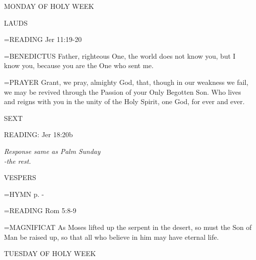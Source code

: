 \begin{center}
\normalsize \begin{center}\normalsize MONDAY OF HOLY WEEK\\
\end{center}
\end{center}

\begin{flushleft}\normalsize LAUDS\\\end{flushleft}

\hangindent=\parindent \small{READING}    Jer 11:19-20 \textbf{   \\}

\hangindent=\parindent \small{BENEDICTUS 	Father, righteous One, the world does not know you, but I know you, because you are the One who sent me.\\}

\hangindent=\parindent \small{PRAYER 	Grant, we pray, almighty God, that, though in our weakness we fail, we may be revived through the Passion of your Only Begotten Son. Who lives and reigns with you in the unity of the Holy Spirit, one God, for ever and ever.}

\begin{flushleft}\normalsize SEXT\\\end{flushleft}

READING:    Jer 18:20b

\begin{center}
\textit{Response same as Palm Sunday\\
-the rest.}
\end{center}

\begin{flushleft}\normalsize VESPERS\\\end{flushleft}

\hangindent=\parindent \small{\uppercase{HYMN} p.  \pageref{holyweek:firstHymn} - \pageref{holyweek:lastHymn}\\}

\hangindent=\parindent \small{READING}    Rom 5:8-9 \textbf{   \\}

\hangindent=\parindent \small{MAGNIFICAT 	As Moses lifted up the serpent in the desert, so must the Son of Man be raised up, so that all who believe in him may have eternal life.\\}

\begin{center}
\normalsize TUESDAY OF HOLY WEEK
\end{center}

